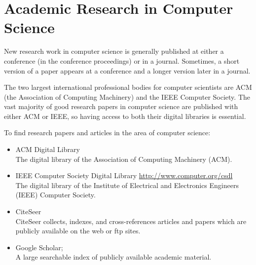 \section{Academic Research in Computer Science}

New research work in computer science is generally published
at either a conference (in the conference proceedings) or in a
journal. Sometimes, a short version of a paper appears at a
conference and a longer version later in a journal.

The two largest international professional bodies for computer
scientists are ACM (the Association of Computing Machinery) and the
IEEE Computer Society. The vast majority of good research papers in
computer science are published with either ACM or IEEE, so having
access to both their digital libraries is essential.


To find research papers and articles in the area of computer science:
\begin{itemize}
\item ACM Digital Library  \\
  The digital library of the Association of Computing Machinery (ACM).
  \parencite{ACM-DL}

\item IEEE Computer Society Digital Library
  \url{http://www.computer.org/csdl} \\
  The digital library of the Institute of Electrical
  and Electronics Engineers (IEEE) Computer Society.
  \parencite{IEEE-DL}

\item CiteSeer  \\
  CiteSeer collects, indexes, and cross-references articles
  and papers which are publicly available on the web or ftp sites.

\item Google Scholar;  \\
  A large searchable index of publicly available academic material.
\end{itemize}


